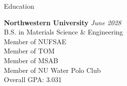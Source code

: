\documentclass[
	a4paper, %
	11pt, %
]{resume} %
\begin{document}

\begin{rSection}{Education}
	
	\textbf{Northwestern University} \hfill \textit{June 2028} \\ 
	B.S. in Materials Science \& Engineering \\
	Member of NUFSAE \\
	Member of TOM \\
	Member of MSAB \\
	Member of NU Water Polo Club \\
	Overall GPA: 3.031
	
\end{rSection}

\end{document}
